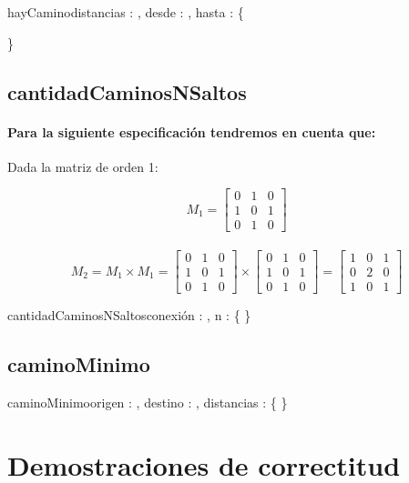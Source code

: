 \documentclass[10pt,a4paper]{article}
\begin{document}
\begin{proc}{hayCamino}{\In distancias : \TLista{\TLista{\ent}}, \In desde : \ent, \In hasta : \ent}{\bool \{ } 
	
\end{proc}


\}


\subsection{cantidadCaminosNSaltos}
\paragraph{Para la siguiente especificación tendremos en cuenta que:}{Dada la matriz de orden 1:}

\[
M_{1} = \begin{bmatrix} 0 & 1 & 0 \\	1 & 0 & 1 \\	0 & 1 & 0 \end{bmatrix} \]
\\
\[
M_{2} = M_{1} \times M_{1} =
\begin{bmatrix}	0 & 1 & 0 \\	1 & 0 & 1 \\	0 & 1 & 0\end{bmatrix}
\times
\begin{bmatrix}	0 & 1 & 0 \\	1 & 0 & 1 \\	0 & 1 & 0\end{bmatrix}
=
\begin{bmatrix}	1 & 0 & 1 \\	0 & 2 & 0 \\	1 & 0 & 1\end{bmatrix}
\]

\begin{proc}{cantidadCaminosNSaltos}{\Inout conexión : \TLista{\TLista{\ent}}, \In n : \ent}{ \{ } 
\requiere{\{ \True\}}
\asegura{\{\True\}}
\}
\end{proc}

\subsection{caminoMinimo}

\begin{proc}{caminoMinimo}{\In origen : \ent, \In destino : \ent, \In distancias : \TLista{\TLista{\ent}}}{\TLista{\ent} \{ } 
\requiere{\{ \True \}}
\asegura{\{\True\}}
\}
\end{proc}

\section{Demostraciones de correctitud}
\end{document}
